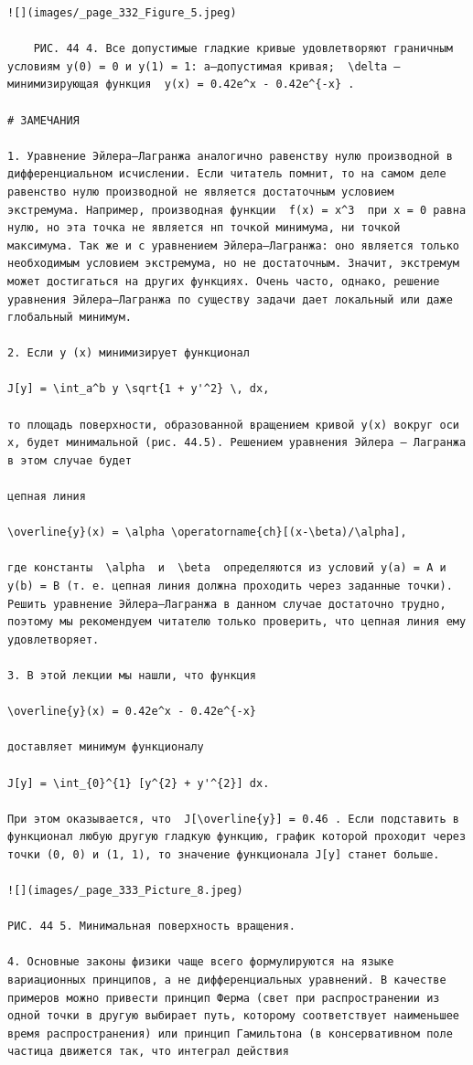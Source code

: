 \documentclass[
  ukrainian,
]{article}
\begin{document}
\begin{verbatim}
![](images/_page_332_Figure_5.jpeg)

    РИС. 44 4. Все допустимые гладкие кривые удовлетворяют граничным условиям y(0) = 0 и y(1) = 1: a—допустимая кривая;  \delta —минимизирующая функция  y(x) = 0.42e^x - 0.42e^{-x} .

# ЗАМЕЧАНИЯ

1. Уравнение Эйлера—Лагранжа аналогично равенству нулю производной в дифференциальном исчислении. Если читатель помнит, то на самом деле равенство нулю производной не является достаточным условием экстремума. Например, производная функции  f(x) = x^3  при x = 0 равна нулю, но эта точка не является нп точкой минимума, ни точкой максимума. Так же и с уравнением Эйлера—Лагранжа: оно является только необходимым условием экстремума, но не достаточным. Значит, экстремум может достигаться на других функциях. Очень часто, однако, решение уравнения Эйлера—Лагранжа по существу задачи дает локальный или даже глобальный минимум.

2. Если у (х) минимизирует функционал

J[y] = \int_a^b y \sqrt{1 + y'^2} \, dx,

то площадь поверхности, образованной вращением кривой y(x) вокруг оси x, будет минимальной (рис. 44.5). Решением уравнения Эйлера — Лагранжа в этом случае будет

цепная линия

\overline{y}(x) = \alpha \operatorname{ch}[(x-\beta)/\alpha],

где константы  \alpha  и  \beta  определяются из условий y(a) = A и y(b) = B (т. е. цепная линия должна проходить через заданные точки). Решить уравнение Эйлера—Лагранжа в данном случае достаточно трудно, поэтому мы рекомендуем читателю только проверить, что цепная линия ему удовлетворяет.

3. В этой лекции мы нашли, что функция

\overline{y}(x) = 0.42e^x - 0.42e^{-x}

доставляет минимум функционалу

J[y] = \int_{0}^{1} [y^{2} + y'^{2}] dx.

При этом оказывается, что  J[\overline{y}] = 0.46 . Если подставить в функционал любую другую гладкую функцию, график которой проходит через точки (0, 0) и (1, 1), то значение функционала J[y] станет больше.

![](images/_page_333_Picture_8.jpeg)

РИС. 44 5. Минимальная поверхность вращения.

4. Основные законы физики чаще всего формулируются на языке вариационных принципов, а не дифференциальных уравнений. В качестве примеров можно привести принцип Ферма (свет при распространении из одной точки в другую выбирает путь, которому соответствует наименьшее время распространения) или принцип Гамильтона (в консервативном поле частица движется так, что интеграл действия


\end{verbatim}
\end{document}

